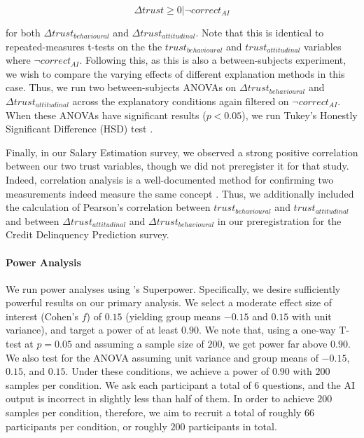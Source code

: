 \begin{equation}
    \Delta trust \geq 0 | \neg correct_{AI}
\end{equation}

\noindent for both $\Delta trust_{behavioural}$ and $\Delta trust_{attitudinal}$. Note that this is identical to repeated-measures t-tests on the the $trust_{behavioural}$ and $trust_{attitudinal}$ variables where $\neg correct_{AI}$. Following this, as this is also a between-subjects experiment, we wish to compare the varying effects of different explanation methods in this case. Thus, we run two between-subjects ANOVAs \cite{Caldwell-et-al} on $\Delta trust_{behavioural}$ and $\Delta trust_{attitudinal}$ across the explanatory conditions again filtered on $\neg correct_{AI}$. When these ANOVAs have significant results ($p < 0.05$), we run Tukey's Honestly Significant Difference (HSD) test \cite{Caldwell-et-al}.

Finally, in our Salary Estimation survey, we observed a strong positive correlation between our two trust variables, though we did not preregister it for that study. Indeed, correlation analysis is a well-documented method for confirming two measurements indeed measure the same concept \cite{Westen-and-Rosenthal, Morata-Ramírez-and-Holgado-Tello}. Thus, we additionally included the calculation of Pearson's correlation between $trust_{behavioural}$ and $trust_{attitudinal}$ and between $\Delta trust_{attitudinal}$ and $\Delta trust_{behavioural}$ in our preregistration for the Credit Delinquency Prediction survey. 

\paragraph{Power Analysis}
We run power analyses using \textcite{Caldwell-et-al}'s Superpower. Specifically, we desire sufficiently powerful results on our primary analysis. We select a moderate effect size of interest (Cohen’s $f$) of $0.15$ (yielding group means $-0.15$ and $0.15$ with unit variance), and target a power of at least $0.90$. We note that, using a one-way T-test at $p = 0.05$ and assuming a sample size of $200$, we get power far above $0.90$. We also test for the ANOVA assuming unit variance and group means of $-0.15$, $0.15$, and $0.15$. Under these conditions, we achieve a power of $0.90$ with $200$ samples per condition. We ask each participant a total of 6 questions, and the AI output is incorrect in slightly less than half of them. In order to achieve $200$ samples per condition, therefore, we aim to recruit a total of roughly $66$ participants per condition, or roughly $200$ participants in total.

